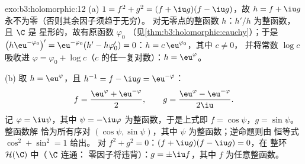 \begin{solution}{exo:b3:holomorphic:12}
(a) $1 = f^2 + g^2 = (f + \iu g)(f - \iu g)$，故 $h = f +
\iu g$ 永不为零（否则其余因子须趋于无穷）。
对无零点的整函数 $h$：$h'/h$ 为整函数，且 $\C$ 是
星形的，故有原函数 $\varphi_0$
（见\cref{thm:b3:holomorphic:cauchy}）；于是
$\bigl(h\eu^{-\varphi_0}\bigr)' = \eu^{-\varphi_0}(h' -
h\varphi_0') = 0$：$h = c\,\eu^{\varphi_0}$，其中 $c \neq 0$，
并将常数 $\log c$ 吸收进 $\varphi = \varphi_0
+ \log c$（$c$ 的任一复对数）：$h =
\eu^{\varphi}$。

(b) 取 $h = \eu^{\varphi}$，且 $h^{-1} = f - \iu g =
\eu^{-\varphi}$：
\[
f = \frac{\eu^{\varphi} + \eu^{-\varphi}}2,
\qquad
g = \frac{\eu^{\varphi} - \eu^{-\varphi}}{2\iu} .
\]
记 $\varphi = \iu\psi$，其中 $\psi = -\iu\varphi$
为整函数，于是上式即 $f = \cos\psi$，$g = \sin\psi$。整函数解
恰为所有序对 $(\cos\psi,
\sin\psi)$，其中 $\psi$ 为整函数；逆命题则由
恒等式 $\cos^2 + \sin^2 = 1$ 给出。
对 $f^2 + g^2 = 0$：$(f + \iu g)(f - \iu g) = 0$，在
整环 $\mathcal H(\C)$ 中（\,$\C$ 连通：
零因子将违背）：$g = \pm\iu
f$，其中 $f$ 为任意整函数。
\end{solution}

